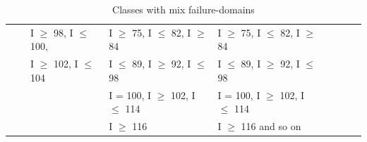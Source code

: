 \begin{table}[h]
{{\begin{tabular}{|l|l|l|l|l|l|l|l|l|}
	&                              			& I $\ge$ 98, I $\le$ 100, 				& I $\ge$ 75, I $\le$ 82, I $\ge$ 84				& I $\ge$ 75, I $\le$ 82, I $\ge$ 84 					    		 \\	
	&                               			& I $\ge$ 102, I $\le$ 104				& I $\le$ 89, I $\ge$ 92, I $\le$ 98				& I $\le$ 89, I $\ge$ 92, I $\le$ 98 							\\	
	&                               			& 										& I = 100, I $\ge$ 102, I $\le$ 114				& I = 100, I $\ge$ 102, I $\le$ 114 							\\	
	&                               			& 										& I $\ge$ 116									& I $\ge$ 116 and so on  										\\	


	
\hline
\end{tabular}
}
}
\bigskip
\caption{Classes with mix failure-domains}
\label{table:mixDomains}
\end{table}
